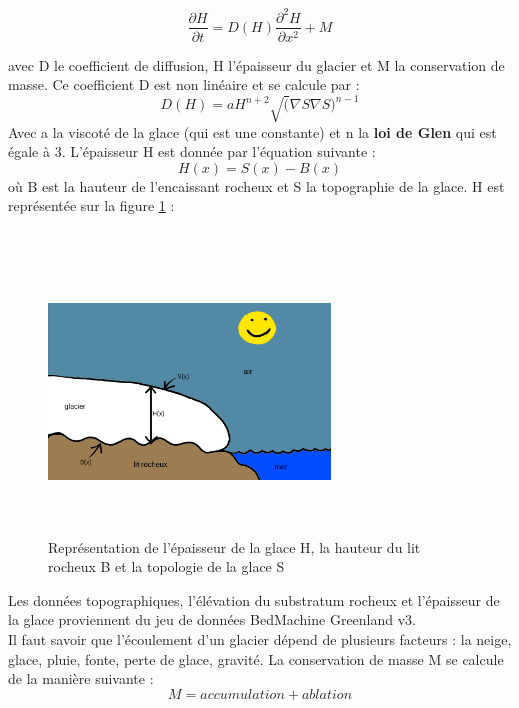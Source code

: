 \documentclass{article}
\begin{document}
\begin{equation}
\frac{\partial H}{\partial t}=D(H)\frac{{\partial}^{2}H}{\partial x^{2}} + M
\label{eq4}
\end{equation}

avec D le coefficient de diffusion, H l'épaisseur du glacier et M la conservation de masse. 
\newline
Ce coefficient D est non linéaire et se calcule par :
\begin{equation}
D(H) = aH^{n+2}\sqrt(\nabla S\nabla S)^{n-1}
\label{eq5}
\end{equation}
Avec a la viscoté de la glace (qui est une constante) et n la \textbf{loi de Glen} qui est égale à 3.
\newline
L'épaisseur H est donnée par l'équation suivante :
\begin{equation}
H(x) = S(x) - B(x)
\label{eq6}
\end{equation}
où B est la hauteur de l'encaissant rocheux et S la topographie de la glace. H est représentée sur la figure \ref{fig01} : 
\\
\\
\begin{figure}[!htpb]
\centering
\includegraphics[width=7.5cm, keepaspectratio=true, height=7.5cm]{H.png}
\caption{Représentation de l'épaisseur de la glace H, la hauteur du lit rocheux B et la topologie de la glace S}
\label{fig01}
\end{figure}
\newline

Les données topographiques, l'élévation du substratum rocheux et l'épaisseur de la glace proviennent du jeu de données BedMachine Greenland v3. 
\\

Il faut savoir que l'écoulement d'un glacier dépend de plusieurs facteurs : la neige, glace, pluie, fonte, perte de glace, gravité. La conservation de masse M se calcule de la manière suivante :
\begin{equation}
M = accumulation + ablation
\label{5}
\end{equation}
\end{document}

